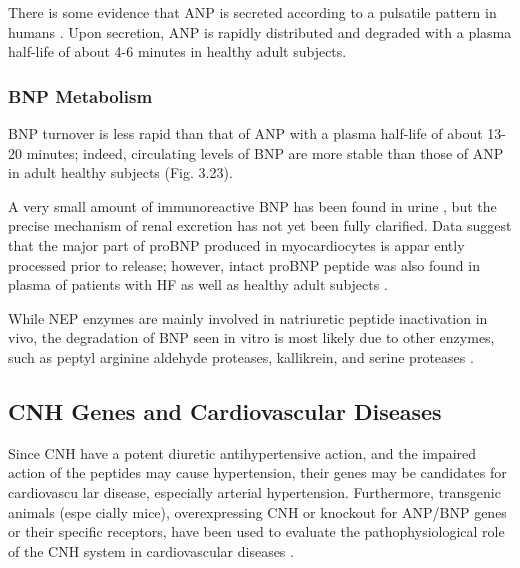 \documentclass[14pt,a4paper,onecolumn]{extarticle}
\begin{document}
There is some evidence that ANP is secreted according to a pulsatile pattern in humans \citep{197}. Upon secretion, ANP is rapidly distributed and degraded  with a plasma half-life of about 4-6 minutes in healthy adult subjects.

\subsubsection{BNP Metabolism}

BNP turnover is less rapid than that of ANP with a plasma half-life of about 13-20 minutes; indeed, circulating levels of BNP are more stable than those of ANP in adult healthy subjects (Fig. 3.23).

A very small amount of immunoreactive BNP has been found in urine \citep{203}, but the precise mechanism of renal excretion has not yet been fully clarified.  Data suggest that the major part of proBNP produced in myocardiocytes is appar ently processed prior to release; however, intact proBNP peptide was also found in plasma of patients with HF as well as healthy adult subjects \citep{14}.

While NEP enzymes are mainly involved in natriuretic peptide inactivation in vivo, the degradation of BNP seen in vitro is most likely due to other enzymes, such as peptyl arginine aldehyde proteases, kallikrein, and serine proteases \citep{15}.

\subsection{CNH Genes and Cardiovascular Diseases}

Since CNH have a potent diuretic antihypertensive action, and the impaired action of the peptides may cause hypertension, their genes may be candidates for cardiovascu lar disease, especially arterial hypertension. Furthermore, transgenic animals (espe cially mice), overexpressing CNH or knockout for ANP/BNP genes or their specific receptors, have been used to evaluate the pathophysiological role of the CNH system in cardiovascular diseases \citep{251}.
\end{document}
